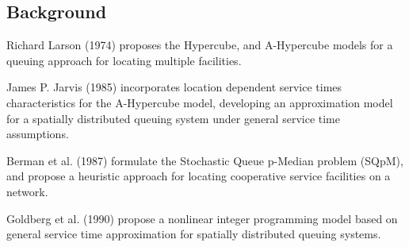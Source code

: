 \subsection{Background}
\begin{frame}[allowframebreaks]
  Richard Larson (1974) \cite{larson1974hypercube,larson1975approximating}
  proposes the Hypercube, and A-Hypercube models
  for a queuing approach for locating multiple facilities.

  James P. Jarvis (1985) \cite{jarvis1985approximating} incorporates
  location dependent service times characteristics for the A-Hypercube model,
  developing an approximation model for a spatially distributed queuing system
  under general service time assumptions.

  Berman et al. (1987) \cite{berman1987stochastic}
  formulate the Stochastic Queue p-Median problem (SQpM),
  and propose a heuristic approach for locating cooperative service facilities
  on a network.

  Goldberg et al. (1990) \cite{goldberg1990validating}
  propose a nonlinear integer programming model
  based on general service time approximation
  for spatially distributed queuing systems.

\end{frame}

